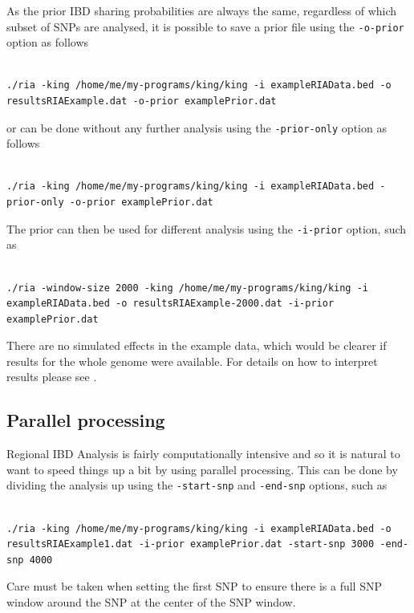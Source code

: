 \documentclass[a4paper,12pt]{article}
\newcommand{\code}[1]{{\footnotesize{{\tt #1}}}}
\begin{document}
As the prior IBD sharing probabilities are always the same, regardless of which subset of SNPs are analysed, it is possible to save a prior file using the \code{-o-prior} option as follows 
\vspace{0.35cm} \begin{lstlisting}

./ria -king /home/me/my-programs/king/king -i exampleRIAData.bed -o resultsRIAExample.dat -o-prior examplePrior.dat

\end{lstlisting} \vspace{0.35cm}
or can be done without any further analysis using the \code{-prior-only} option as follows 
\vspace{0.35cm} \begin{lstlisting}

./ria -king /home/me/my-programs/king/king -i exampleRIAData.bed -prior-only -o-prior examplePrior.dat

\end{lstlisting} \vspace{0.35cm}
The prior can then be used for different analysis using the \code{-i-prior} option, such as 
\vspace{0.35cm} \begin{lstlisting}

./ria -window-size 2000 -king /home/me/my-programs/king/king -i exampleRIAData.bed -o resultsRIAExample-2000.dat -i-prior examplePrior.dat

\end{lstlisting} \vspace{0.35cm}
There are no simulated effects in the example data, which would be clearer if results for the whole genome were available. For details on how to interpret results please see \citet{nat:15}. 
\subsection{Parallel processing}
\label{parallel}

Regional IBD Analysis is fairly computationally intensive and so it is natural to want to speed things up a bit by using parallel processing. This can be done by dividing the analysis up using the \code{-start-snp} and \code{-end-snp} options, such as 
\vspace{0.35cm} \begin{lstlisting}

./ria -king /home/me/my-programs/king/king -i exampleRIAData.bed -o resultsRIAExample1.dat -i-prior examplePrior.dat -start-snp 3000 -end-snp 4000

\end{lstlisting} \vspace{0.35cm}
Care must be taken when setting the first SNP to ensure there is a full SNP window around the SNP at the center of the SNP window. 
\end{document}
